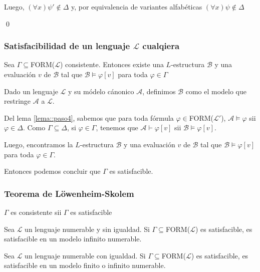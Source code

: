 \begin{demoPart}
\begin{itemize}
Luego, $(\forall x)\psi'\notin\Delta$ y, por equivalencia de variantes alfabéticas $(\forall x)\psi\notin\Delta$ 
\end{itemize}\qed
\end{demoPart}

\subsubsection{Satisfacibilidad de un lenguaje $\mathcal{L}$ cualqiera}
\begin{teorema}
	Sea $\Gamma\subseteq$FORM($\mathcal{L}$) consistente. Entonces existe una $L$-estructura $\mathcal{B}$ y una evaluación $v$ de $\mathcal{B}$ tal que $\mathcal{B}\vDash\varphi[v]$ para toda $\varphi\in\Gamma$	
\end{teorema}

\begin{demo}
	Dado un lenguaje $\mathcal{L}$ y su módelo cánonico $\mathcal{A}$, definimos $\mathcal{B}$ como el modelo que restringe $\mathcal{A}$ a $\mathcal{L}$.
	
	Del lema \ref{lema::paso4}, sabemos que para toda fórmula $\varphi\in$FORM($\mathcal{L'}$), $\mathcal{A}\vDash\varphi$ sii  $\varphi\in\Delta$. Como $\Gamma\subseteq\Delta$, si $\varphi\in\Gamma$, tenemos que $\mathcal{A}\vdash\varphi[v]$ sii $\mathcal{B}\vDash\varphi[v]$.
	
	Luego, encontramos la $L$-estructura $\mathcal{B}$ y una evaluación $v$ de $\mathcal{B}$ tal que $\mathcal{B}\vDash\varphi[v]$ para toda $\varphi\in\Gamma$.
	
	Entonces podemos concluir que $\Gamma$ es satisfacible.

\end{demo}

\subsubsection{Teorema de Löwenheim-Skolem}
\begin{corolario}
	$\Gamma$ es consistente sii $\Gamma$ es satisfacible
\end{corolario}

\begin{teorema}
	Sea $\mathcal{L}$ un lenguaje numerable y sin igualdad. Si $\Gamma\subseteq$FORM($\mathcal{L}$) es satisfacible, es satisfacible en un modelo infinito numerable.	
\end{teorema}

\begin{teorema}
	Sea $\mathcal{L}$ un lenguaje numerable con igualdad. Si $\Gamma\subseteq$FORM($\mathcal{L}$) es satisfacible, es satisfacible en un modelo finito o infinito numerable.	
\end{teorema}


